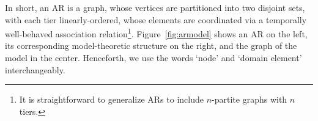 \documentclass[pmlr]{jmlr}%
\begin{document}
	In short, an AR is a graph, whose vertices are
	partitioned into two disjoint sets, with each tier
	linearly-ordered, whose elements are coordinated via a temporally
	well-behaved association relation\footnote{It is straightforward
		to generalize ARs to include \(n\)-partite graphs with \(n\) tiers.}.
	Figure~\ref{fig:armodel} shows an AR on the left,
	its corresponding model-theoretic structure on the right, and the graph of the model in the center.
	Henceforth, we use the words `node' and `domain element' interchangeably.
	\begin{figure}[t]
		\centering
		
		\begin{minipage}[c]{0.20\textwidth}
			\centering
			
			
		\end{minipage}
		\hspace{0.03\textwidth}
		\begin{minipage}[c]{0.20\textwidth}
			\centering
			
			
		\end{minipage}
		\hspace{0.03\textwidth}
		\begin{minipage}[c]{0.40\textwidth}
			\centering
			\footnotesize
			

\end{minipage}
\end{figure}
\end{document}
